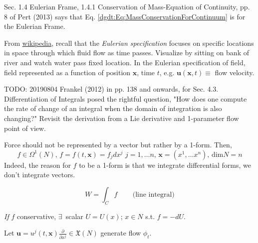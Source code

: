 Sec. 1.4 Eulerian Frame, 1.4.1 Conservation of Mass-Equation of Continuity, pp. 8 of Pert (2013) \cite{dgdt:Pert2013} says that Eq. \ref{dgdt:Eq:MassConservationForContinuum} is for the Eulerian Frame.

From \href{https://en.wikipedia.org/wiki/Lagrangian_and_Eulerian_specification_of_the_flow_field}{wikipedia}, recall that the \emph{Eulerian specification} focuses on specific locations in space through which fluid flow as time passes. Visualize by sitting on bank of river and watch water pass fixed location. In the Eulerian specification of field, field represented as a function of position $\mathbf{x}$, time $t$, e.g. $\mathbf{u}(\mathbf{x}, t) \equiv $ flow velocity.




TODO: 20190804 Frankel (2012) \cite{dgdt:TFrankel2012} in pp. 138 and onwards, for Sec. 4.3. Differentiation of Integrals posed the rightful question, "How does one compute the rate of change of an integral when the domain of integration is also changing?" Revisit the derivation from a Lie derivative and 1-parameter flow point of view.

Force should not be represented by a vector but rather by a 1-form. Then, 
\[
f \in \Omega^1(N), \, f=f(t, \mathbf{x}) = f_j dx^j \, \, j=1, \dots n , \, \mathbf{x} = (x^1, \dots x^n), \, \text{dim}N = n
\]
Indeed, the reason for $f$ to be a 1-form is that we integrate differential forms, we don't integrate vectors. 

\begin{equation}
W = \int_C f \qquad \, \text{(line integral)}
\end{equation}

\emph{If} $f$ conservative, $\exists\, $ scalar $U = U(x)$; $x\in N$ s.t. $f=-dU$.

Let $\mathbf{u} = u^j(t,\mathbf{x}) \frac{\partial}{ \partial x^j} \in \mathfrak{X}(N)$ generate flow $\phi_t$.

